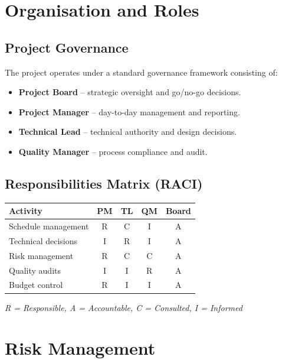 \documentclass[12pt,a4paper]{article}
\begin{document}
\section{Organisation and Roles}

\subsection{Project Governance}
The project operates under a standard governance framework consisting of:

\begin{itemize}
  \item \textbf{Project Board} -- strategic oversight and go/no-go decisions.
  \item \textbf{Project Manager} -- day-to-day management and reporting.
  \item \textbf{Technical Lead} -- technical authority and design decisions.
  \item \textbf{Quality Manager} -- process compliance and audit.
\end{itemize}

\subsection{Responsibilities Matrix (RACI)}
\begin{tabularx}{\textwidth}{|X|c|c|c|c|}
  \hline
  \rowcolor{lightgray}
  \textbf{Activity} & \textbf{PM} & \textbf{TL} & \textbf{QM} & \textbf{Board} \\
  \hline
  Schedule management   & R & C & I & A \\
  Technical decisions   & I & R & I & A \\
  Risk management       & R & C & C & A \\
  Quality audits        & I & I & R & A \\
  Budget control        & R & I & I & A \\
  \hline
\end{tabularx}

\vspace{6pt}
\noindent\textit{R = Responsible, A = Accountable, C = Consulted, I = Informed}

\section{Risk Management}
\end{document}
